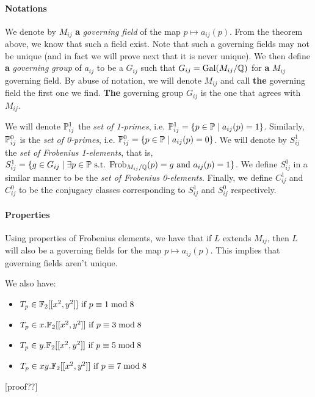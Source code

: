 \paragraph{Notations}
We denote by $M_{ij}$ \textbf{a} \textit{governing field} of the map $p \mapsto a_{ij}(p)$.
From the theorem above, we know that such a field exist.
Note that such a governing fields may not be unique (and in fact we will prove next that it is never unique).
We then define \textbf{a} \textit{governing group} of $a_{ij}$ to be a $G_{ij}$ such that $G_{ij} = \text{Gal}(M_{ij}/\mathbb{Q})$ for \textbf{a} $M_{ij}$ governing field.
By abuse of notation, we will denote $M_{ij}$ and call \textbf{the} governing field the first one we find.
\textbf{The} governing group $G_{ij}$ is the one that agrees with $M_{ij}$.

We will denote $\mathbb{P}_{ij}^1$ the \textit{set of 1-primes}, i.e. $\mathbb{P}_{ij}^1 = \{ p \in \mathbb{P} \mid a_{ij}(p)=1 \}$.
Similarly, $\mathbb{P}_{ij}^0$ is the \textit{set of 0-primes}, i.e. $\mathbb{P}_{ij}^0 = \{ p \in \mathbb{P} \mid a_{ij}(p)=0 \}$.
We will denote by $S_{ij}^1$ the \textit{set of Frobenius 1-elements}, that is, $S_{ij}^1 = \{ g \in G_{ij} \mid \exists p \in \mathbb{P} \text{ s.t. } \text{Frob}_{M_{ij}/\mathbb{Q}}(p)=g \text{ and } a_{ij}(p)=1 \}$.
We define $S_{ij}^0$ in a similar manner to be the \textit{set of Frobenius 0-elements}.
Finally, we define $C_{ij}^1$ and $C_{ij}^0$ to be the conjugacy classes corresponding to $S_{ij}^1$ and $S_{ij}^0$ respectively.

\paragraph{Properties}
Using properties of Frobenius elements, we have that if $L$ extends $M_{ij}$, then $L$ will also be a governing fields for the map $p \mapsto a_{ij}(p)$.
This implies that governing fields aren't unique.

We also have:
\begin{itemize}
	\item $T_p \in \mathbb{F}_2[[x^2, y^2]] \text{ if } p \equiv 1 \bmod 8$
	\item $T_p \in x.\mathbb{F}_2[[x^2, y^2]] \text{ if } p \equiv 3 \bmod 8$
	\item $T_p \in y.\mathbb{F}_2[[x^2, y^2]] \text{ if } p \equiv 5 \bmod 8$
	\item $T_p \in xy.\mathbb{F}_2[[x^2, y^2]] \text{ if } p \equiv 7 \bmod 8$
\end{itemize}
\cite[§7]{StructureAlgebreHecke}
[proof??]

